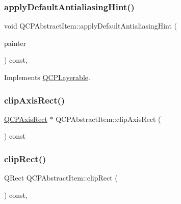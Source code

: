 \subsubsection{\texorpdfstring{apply\+Default\+Antialiasing\+Hint()}{applyDefaultAntialiasingHint()}}
{\footnotesize\ttfamily void Q\+C\+P\+Abstract\+Item\+::apply\+Default\+Antialiasing\+Hint (\begin{DoxyParamCaption}\item[{\hyperlink{class_q_c_p_painter}{Q\+C\+P\+Painter} $\ast$}]{painter }\end{DoxyParamCaption}) const\hspace{0.3cm}{\ttfamily [protected]}, {\ttfamily [virtual]}}



Implements \hyperlink{class_q_c_p_layerable_afdf83ddc6a265cbf4c89fe99d3d93473}{Q\+C\+P\+Layerable}.

\mbox{\label{class_q_c_p_abstract_item_ae162314efd3fe1a6d4df11da1d275d52}} 
\subsubsection{\texorpdfstring{clip\+Axis\+Rect()}{clipAxisRect()}}
{\footnotesize\ttfamily \hyperlink{class_q_c_p_axis_rect}{Q\+C\+P\+Axis\+Rect} $\ast$ Q\+C\+P\+Abstract\+Item\+::clip\+Axis\+Rect (\begin{DoxyParamCaption}{ }\end{DoxyParamCaption}) const}

\mbox{\label{class_q_c_p_abstract_item_a6ad60000f29afe11035e1f791dcbd45a}} 
\subsubsection{\texorpdfstring{clip\+Rect()}{clipRect()}}
{\footnotesize\ttfamily Q\+Rect Q\+C\+P\+Abstract\+Item\+::clip\+Rect (\begin{DoxyParamCaption}{ }\end{DoxyParamCaption}) const\hspace{0.3cm}{\ttfamily [protected]}, {\ttfamily [virtual]}}



